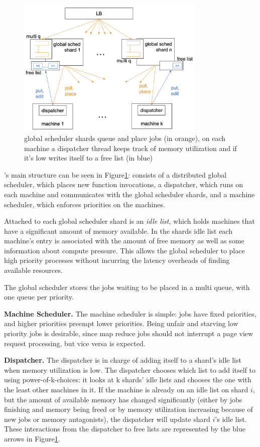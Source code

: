 \begin{figure}[t]
    \centering
      \includegraphics[width=9cm]{img/overview.png}
      \caption{ global scheduler shards queue and place jobs (in orange), 
      on each machine a dispatcher thread keeps track of memory utilization 
      and if it's low writes itself to a free list (in blue) }
    \label{fig:overview}
\end{figure}
  

\sys{}'s main structure can be seen in Figure\ref{fig:overview}: \sys{} consists
of a distributed global scheduler, which places new function invocations, a
dispatcher, which runs on each machine and communicates with the global
scheduler shards, and a machine scheduler, which enforces priorities on the
machines.

Attached to each global scheduler shard is an \textit{idle list}, which holds
machines that have a significant amount of memory available. In the shards idle
list each machine's entry is associated with the amount of free memory as well
as some information about compute pressure. This allows the global scheduler to
place high priority processes without incurring the latency overheads of finding
available resources.

The global scheduler stores the jobs waiting to be placed in a multi queue, with
one queue per priority.


\textbf{Machine Scheduler.}
The machine scheduler is simple: jobs have fixed priorities, and higher
priorities preempt lower priorities. Being unfair and starving low priority
jobs is desirable, since map reduce jobs should not interrupt a page view
request processing, but vice versa is expected.


\textbf{Dispatcher.}
The dispatcher is in charge of adding itself to a shard's idle list when memory
utilization is low. The dispatcher chooses which list to add itself to using
power-of-k-choices: it looks at k shards' idle lists and chooses the one with
the least other machines in it. If the machine is already on an idle list on
shard $i$, but the amount of available memory has changed significantly (either
by jobs finishing and memory being freed or by memory utilization increasing
because of new jobs or memory antagonists), the dispatcher will update shard
$i$'s idle list. These interactions from the dispatcher to free lists are
represented by the blue arrows in Figure\ref{fig:overview}.

